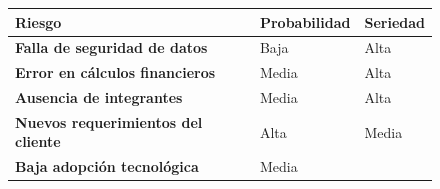 \begin{figure}[H]
    \centering
    \begin{tabularx}{\textwidth}{|X|l|l|}
    \hline
            \textbf{Riesgo} 
        
        & 
        
            \textbf{Probabilidad} 
        
        & 
        
            \textbf{Seriedad} 
        
    \\ \hline
    
            \textbf{Falla de seguridad de datos} 
        
        & 
        
            Baja 
        
        & 
        
            Alta 
        
    \\ \hline
    
            \textbf{Error en cálculos financieros} 
        
        & 
        
            Media 
        
        & 
        
            Alta 
        
    \\ \hline
    
            \textbf{Ausencia de integrantes} 
        
        & 
        
            Media 
        
        & 
        
            Alta 
        
    \\ \hline
    
            \textbf{Nuevos requerimientos del cliente} 
        
        & 
        
            Alta 
        
        & 
        
            Media 
        
    \\ \hline
    
            \textbf{Baja adopción tecnológica} 
        
        & 
        
            Media 
        

\end{tabularx}
\end{figure}
